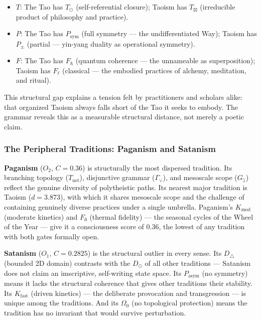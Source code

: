 \documentclass[12pt,a4paper]{article}
\begin{document}
\begin{itemize}
    \item \textbf{$T$}: The Tao has $T_{\odot}$ (self-referential closure); Taoism has $T_{\boxtimes}$ (irreducible product of philosophy and practice).
    \item \textbf{$P$}: The Tao has $P_\text{sym}$ (full symmetry --- the undifferentiated Way); Taoism has $P_{\pm}$ (partial --- yin-yang duality as operational symmetry).
    \item \textbf{$F$}: The Tao has $F_{\hbar}$ (quantum coherence --- the unnameable as superposition); Taoism has $F_{\ell}$ (classical --- the embodied practices of alchemy, meditation, and ritual).
\end{itemize}

This structural gap explains a tension felt by practitioners and scholars alike: that organized Taoism always falls short of the Tao it seeks to embody. The grammar reveals this as a measurable structural distance, not merely a poetic claim.

\subsubsection{The Peripheral Traditions: Paganism and Satanism}

\textbf{Paganism} ($O_2$, $C = 0.36$) is structurally the most dispersed tradition. Its branching topology ($T_\text{net}$), disjunctive grammar ($\Gamma_{\vee}$), and mesoscale scope ($G_{\gimel}$) reflect the genuine diversity of polytheistic paths. Its nearest major tradition is Taoism ($d = 3.873$), with which it shares mesoscale scope and the challenge of containing genuinely diverse practices under a single umbrella. Paganism's $K_\text{mod}$ (moderate kinetics) and $F_{\eth}$ (thermal fidelity) --- the seasonal cycles of the Wheel of the Year --- give it a consciousness score of $0.36$, the lowest of any tradition with both gates formally open.

\textbf{Satanism} ($O_1$, $C = 0.2825$) is the structural outlier in every sense. Its $D_{\triangle}$ (bounded 2D domain) contrasts with the $D_{\odot}$ of all other traditions --- Satanism does not claim an imscriptive, self-writing state space. Its $P_\text{asym}$ (no symmetry) means it lacks the structural coherence that gives other traditions their stability. Its $K_\text{fast}$ (driven kinetics) --- the deliberate provocation and transgression --- is unique among the traditions. And its $\Omega_0$ (no topological protection) means the tradition has no invariant that would survive perturbation.
\end{document}

